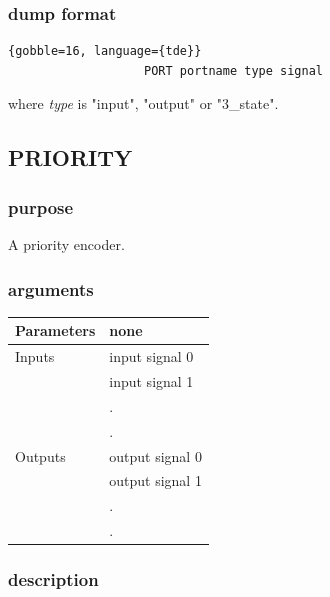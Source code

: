             \subsubsection{dump format}
            
                \begin{lstlisting}{gobble=16, language={tde}}
                   PORT portname type signal
                \end{lstlisting}
                where {\em type} is "input", "output" or "3\_state".



        \subsection{PRIORITY}

            \subsubsection{purpose}
            
                A priority encoder.

            \subsubsection{arguments}
            
                \begin{tabular}{| l | l |}
                \hline
                Parameters  & none \\
                \hline
                Inputs      & input signal 0 \\
                            & input signal 1 \\
                            & . \\
                            & . \\
                \hline
                Outputs     & output signal 0 \\
                            & output signal 1 \\
                            & . \\
                            & . \\
                \hline
                \end{tabular}

            \subsubsection{description}

